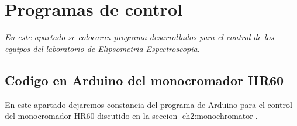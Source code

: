 \appendix

\chapter{Programas de control}
\label{chap:control}
\textit{En este apartado se colocaran programa desarrollados para el control de
los equipos del laboratorio de Elipsometria Espectroscopia.}
\vfill
\minitoc
\newpage

\section{Codigo en Arduino del monocromador HR60}
\label{appendix:arduino}

En este apartado dejaremos constancia del programa de Arduino para el control del monocromador HR60 discutido en la 
seccion \ref{ch2:monochromator}.\\


